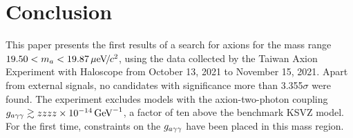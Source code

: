 
\section{Conclusion} 
This paper presents the first results of a search for axions for the mass 
range $19.50 < m_a < 19.87 \,\mu\text{e\hspace{-.08em}V\hspace{-0.16em}/\hspace{-0.08em}}c^2$, using the data collected by the Taiwan 
Axion Experiment with Haloscope from October 13, 2021 to November 15, 2021. 
Apart from external signals, no candidates with significance more than
3.355$\sigma$ were found. The experiment excludes models with the 
axion-two-photon
coupling $g_{a\gamma\gamma}\gtrsim zzzz\times 10^{-14}\,\text{Ge\hspace{-.08em}V}^{-1}$, a factor of ten above the benchmark
KSVZ model. For the first time, 
constraints on the $g_{a\gamma\gamma}$ have been placed in this mass region.


